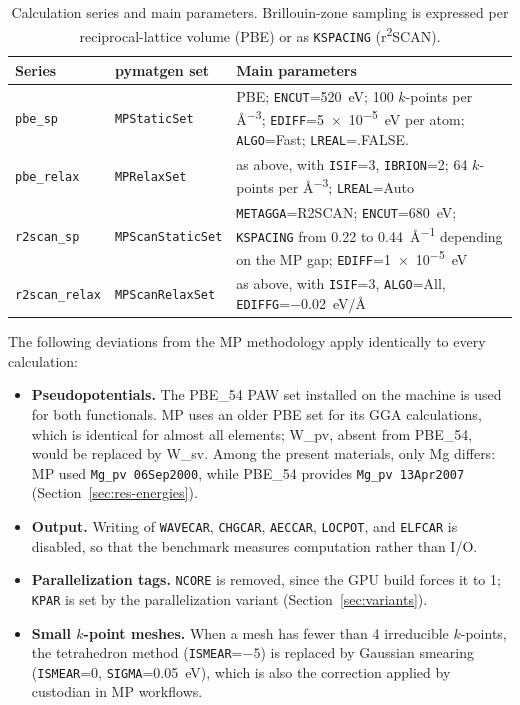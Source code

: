 \documentclass[11pt,letterpaper]{article}
\begin{document}
\begin{table}[htbp]
\centering
\caption{Calculation series and main parameters. Brillouin-zone sampling is expressed per
reciprocal-lattice volume (PBE) or as \texttt{KSPACING} (r\textsuperscript{2}SCAN).}
\label{tab:sets}
\small
\begin{tabular}{@{}llp{9.2cm}@{}}
\toprule
Series & pymatgen set & Main parameters \\
\midrule
\texttt{pbe\_sp} & \texttt{MPStaticSet} & PBE; \texttt{ENCUT}=\SI{520}{eV}; 100 $k$-points per
\si{\angstrom^{-3}}; \texttt{EDIFF}=\SI{5e-5}{eV} per atom; \texttt{ALGO}=Fast;
\texttt{LREAL}=.FALSE. \\
\texttt{pbe\_relax} & \texttt{MPRelaxSet} & as above, with \texttt{ISIF}=3, \texttt{IBRION}=2;
64 $k$-points per \si{\angstrom^{-3}}; \texttt{LREAL}=Auto \\
\texttt{r2scan\_sp} & \texttt{MPScanStaticSet} & \texttt{METAGGA}=R2SCAN;
\texttt{ENCUT}=\SI{680}{eV}; \texttt{KSPACING} from 0.22 to \SI{0.44}{\angstrom^{-1}}
depending on the MP gap; \texttt{EDIFF}=\SI{1e-5}{eV} \\
\texttt{r2scan\_relax} & \texttt{MPScanRelaxSet} & as above, with \texttt{ISIF}=3,
\texttt{ALGO}=All, \texttt{EDIFFG}=\SI{-0.02}{eV/\angstrom} \\
\bottomrule
\end{tabular}
\end{table}

The following deviations from the MP methodology apply identically to every calculation:
\begin{itemize}
  \item \textbf{Pseudopotentials.} The PBE\_54 PAW set installed on the machine is used for
        both functionals. MP uses an older PBE set for its GGA calculations, which is identical
        for almost all elements; W\_pv, absent from PBE\_54, would be replaced by W\_sv. Among
        the present materials, only Mg differs: MP used \texttt{Mg\_pv 06Sep2000}, while
        PBE\_54 provides \texttt{Mg\_pv 13Apr2007} (Section~\ref{sec:res-energies}).
  \item \textbf{Output.} Writing of \texttt{WAVECAR}, \texttt{CHGCAR}, \texttt{AECCAR},
        \texttt{LOCPOT}, and \texttt{ELFCAR} is disabled, so that the benchmark measures
        computation rather than I/O.
  \item \textbf{Parallelization tags.} \texttt{NCORE} is removed, since the GPU build forces it
        to 1; \texttt{KPAR} is set by the parallelization variant
        (Section~\ref{sec:variants}).
  \item \textbf{Small $k$-point meshes.} When a mesh has fewer than 4 irreducible $k$-points,
        the tetrahedron method (\texttt{ISMEAR}=$-5$) is replaced by Gaussian smearing
        (\texttt{ISMEAR}=0, \texttt{SIGMA}=\SI{0.05}{eV}), which is also the correction
        applied by custodian in MP workflows.
\end{itemize}
\end{document}
